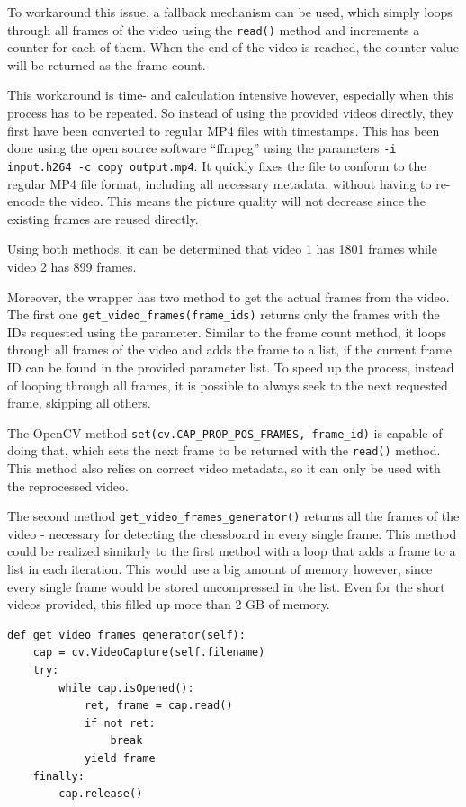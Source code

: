 To workaround this issue, a fallback mechanism can be used, which simply loops through all frames of the video using the \texttt{read()} method and increments a counter for each of them. When the end of the video is reached, the counter value will be returned as the frame count.

This workaround is time- and calculation intensive however, especially when this process has to be repeated. So instead of using the provided videos directly, they first have been converted to regular MP4 files with timestamps. This has been done using the open source software \enquote{ffmpeg} using the parameters \texttt{-i input.h264 -c copy output.mp4}. It quickly fixes the file to conform to the regular MP4 file format, including all necessary metadata, without having to re-encode the video. This means the picture quality will not decrease since the existing frames are reused directly.

Using both methods, it can be determined that video 1 has 1801 frames while video 2 has 899 frames.

Moreover, the wrapper has two method to get the actual frames from the video. The first one \texttt{get\_video\_frames(frame\_ids)} returns only the frames with the IDs requested using the parameter. Similar to the frame count method, it loops through all frames of the video and adds the frame to a list, if the current frame ID can be found in the provided parameter list. To speed up the process, instead of looping through all frames, it is possible to always seek to the next requested frame, skipping all others.

The OpenCV method \texttt{set(cv.CAP\_PROP\_POS\_FRAMES, frame\_id)} is capable of doing that, which sets the next frame to be returned with the \texttt{read()} method. This method also relies on correct video metadata, so it can only be used with the reprocessed video.

The second method \texttt{get\_video\_frames\_generator()} returns all the frames of the video - necessary for detecting the chessboard in every single frame. This method could be realized similarly to the first method with a loop  that adds a frame to a list in each iteration.  This would use a big amount of memory however, since every single frame would be stored uncompressed in the list. Even for the short videos provided, this filled up more than 2 GB of memory.

\begin{lstlisting}[caption={Getting frames of the video using \texttt{yield}}, label={lst:yieldframe}]
def get_video_frames_generator(self):
    cap = cv.VideoCapture(self.filename)
    try:
        while cap.isOpened():
            ret, frame = cap.read()
            if not ret:
                break
            yield frame
    finally:
        cap.release()
\end{lstlisting}

